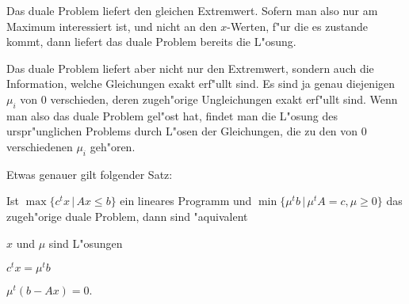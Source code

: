 Das duale Problem liefert den gleichen Extremwert.
Sofern man also nur am Maximum interessiert ist, und nicht an den $x$-Werten,
f"ur die es zustande kommt, dann liefert das duale Problem bereits die
L"osung.

Das duale Problem liefert aber nicht nur den Extremwert, sondern
auch die Information, welche Gleichungen exakt erf"ullt sind.
Es sind ja genau diejenigen $\mu_i$ von $0$ verschieden, deren
zugeh"orige Ungleichungen exakt erf"ullt sind. Wenn man also
das duale Problem gel"ost hat, findet man die L"osung des urspr"unglichen
Problems durch L"osen der Gleichungen, die zu den von $0$ verschiedenen
$\mu_i$ geh"oren.

Etwas genauer gilt folgender Satz:
\begin{satz}
Ist $\max\{c^tx\,|\, Ax\le b\}$ ein lineares Programm und 
$\min\{\mu^tb\,|\, \mu^t A=c, \mu \ge 0\}$ das zugeh"orige duale Problem,
dann sind "aquivalent
\begin{compactenum}
\item $x$ und $\mu$ sind L"osungen
\item $c^tx=\mu^tb$
\item $\mu^t(b-Ax)=0.$
\end{compactenum}
\end{satz}

